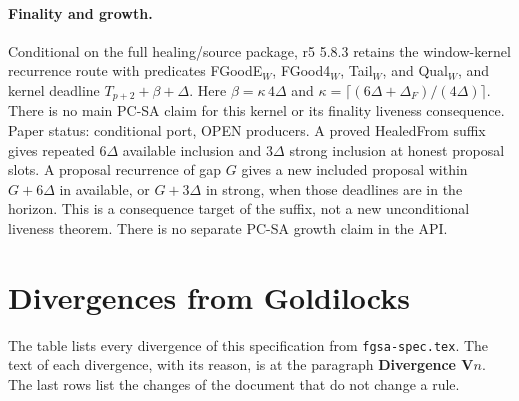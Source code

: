 \documentclass{article}
\newcommand{\nm}[1]{\nolinkurl{#1}}
\begin{document}
\paragraph{Finality and growth.}
Conditional on the full healing/source package, r5 5.8.3 retains the
window-kernel recurrence route with predicates FGoodE$_W$, FGood4$_W$,
Tail$_W$, and Qual$_W$, and kernel deadline $T_{p+2}+\beta+\Delta$.
Here $\beta=\kappa\,4\Delta$ and
$\kappa=\lceil(6\Delta+\Delta_F)/(4\Delta)\rceil$.
There is no main PC-SA claim for this kernel or its finality liveness
consequence. Paper status: conditional port, OPEN producers.
A proved HealedFrom suffix gives repeated $6\Delta$ available inclusion
and $3\Delta$ strong inclusion at honest proposal slots. A proposal
recurrence of gap $G$ gives a new included proposal within $G+6\Delta$
in available, or $G+3\Delta$ in strong, when those deadlines are in the
horizon. This is a consequence target of the suffix, not a new unconditional
liveness theorem. There is no separate PC-SA growth claim in the API.


\appendix

\section{Divergences from Goldilocks}\label{sec:divergences}

The table lists every divergence of this specification from
\nm{fgsa-spec.tex}.  The text of each divergence, with its reason, is at
the paragraph \textbf{Divergence V$n$}.  The last rows list the changes of
the document that do not change a rule.
\end{document}
